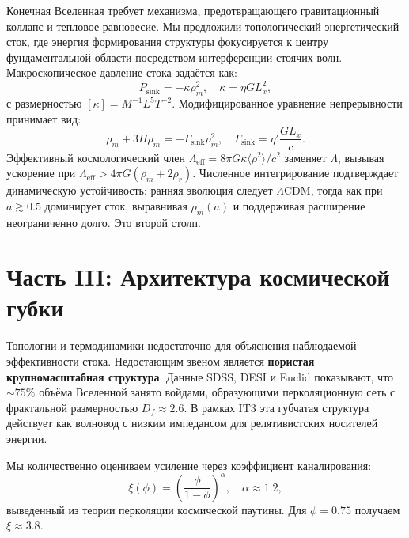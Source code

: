 \documentclass[12pt,a4paper]{article}
\begin{document}
Конечная Вселенная требует механизма, предотвращающего гравитационный коллапс и тепловое равновесие. Мы предложили топологический энергетический сток, где энергия формирования структуры фокусируется к центру фундаментальной области посредством интерференции стоячих волн. Макроскопическое давление стока задаётся как:
\begin{equation}
P_{\text{sink}} = -\kappa \rho_m^2, \quad \kappa = \eta G L_x^2,
\end{equation}
с размерностью $[\kappa] = M^{-1}L^5T^{-2}$. Модифицированное уравнение непрерывности принимает вид:
\begin{equation}
\dot{\rho}_m + 3H\rho_m = -\Gamma_{\text{sink}}\rho_m^2, \quad \Gamma_{\text{sink}} = \eta' \frac{G L_x}{c}.
\end{equation}
Эффективный космологический член $\Lambda_{\text{eff}} = 8\pi G \kappa \langle \rho^2 \rangle / c^2$ заменяет $\Lambda$, вызывая ускорение при $\Lambda_{\text{eff}} > 4\pi G(\rho_m + 2\rho_r)$. Численное интегрирование подтверждает динамическую устойчивость: ранняя эволюция следует $\Lambda$CDM, тогда как при $a \gtrsim 0.5$ доминирует сток, выравнивая $\rho_m(a)$ и поддерживая расширение неограниченно долго. Это второй столп.

\section{Часть III: Архитектура космической губки}

Топологии и термодинамики недостаточно для объяснения наблюдаемой эффективности стока. Недостающим звеном является \textbf{пористая крупномасштабная структура}. Данные SDSS, DESI и Euclid показывают, что $\sim 75\%$ объёма Вселенной занято войдами, образующими перколяционную сеть с фрактальной размерностью $D_f \approx 2.6$. В рамках IT3 эта губчатая структура действует как волновод с низким импедансом для релятивистских носителей энергии.

Мы количественно оцениваем усиление через коэффициент каналирования:
\begin{equation}
\xi(\phi) = \left( \frac{\phi}{1-\phi} \right)^\alpha, \quad \alpha \approx 1.2,
\end{equation}
выведенный из теории перколяции космической паутины. Для $\phi = 0.75$ получаем $\xi \approx 3.8$. 
\end{document}
